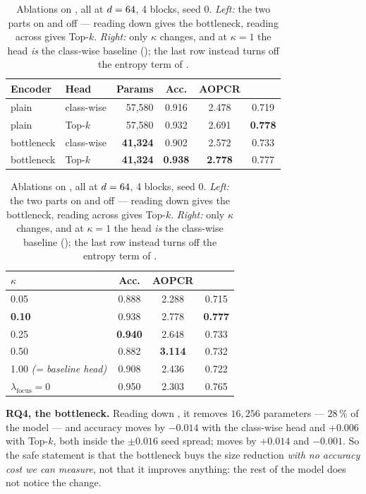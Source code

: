 \begin{table}[t]
\caption{Ablations on \webtraffic{}, all at $d = 64$, 4 blocks, seed 0. \emph{Left:} the two
parts on and off --- reading down gives the bottleneck, reading across gives \mbox{Top-$k$}.
\emph{Right:} only $\kappa$ changes, and at $\kappa = 1$ the head \emph{is} the class-wise baseline
(); the last row instead turns off the entropy term of .}
\label{tab:ablation}
\begin{center}
\begin{minipage}[t]{0.51\textwidth}
\centering
\scriptsize
\setlength{\tabcolsep}{3.5pt}
\begin{tabular}{llrccc}
\toprule
\textbf{Encoder} & \textbf{Head} & Params & Acc. & AOPCR & \ndcg{} \\
\midrule
plain      & class-wise & 57{,}580 & 0.916 & 2.478 & 0.719 \\
plain      & Top-$k$    & 57{,}580 & 0.932 & 2.691 & \textbf{0.778} \\
bottleneck & class-wise & \textbf{41{,}324} & 0.902 & 2.572 & 0.733 \\
bottleneck & Top-$k$    & \textbf{41{,}324} & \textbf{0.938} & \textbf{2.778} & 0.777 \\
\bottomrule
\end{tabular}
\end{minipage}\hfill
\begin{minipage}[t]{0.45\textwidth}
\centering
\scriptsize
\setlength{\tabcolsep}{4pt}
\begin{tabular}{lccc}
\toprule
$\kappa$ & Acc. & AOPCR & \ndcg{} \\
\midrule
0.05 & 0.888 & 2.288 & 0.715 \\
\textbf{0.10} & 0.938 & 2.778 & \textbf{0.777} \\
0.25 & \textbf{0.940} & 2.648 & 0.733 \\
0.50 & 0.882 & \textbf{3.114} & 0.732 \\
1.00 \emph{(= baseline head)} & 0.908 & 2.436 & 0.722 \\
\midrule
$\lambda_{\mathrm{focus}} = 0$ & 0.950 & 2.303 & 0.765 \\
\bottomrule
\end{tabular}
\end{minipage}
\end{center}
\end{table}

\textbf{RQ4, the bottleneck.} Reading down , it removes $16{,}256$ parameters ---
$28\,\%$ of the model --- and accuracy moves by $-0.014$ with the class-wise head and $+0.006$ with
\mbox{Top-$k$}, both inside the $\pm 0.016$ seed spread; \ndcg{} moves by $+0.014$ and $-0.001$. So
the safe statement is that the bottleneck buys the size reduction \emph{with no accuracy cost we can
measure}, not that it improves anything: the rest of the model does not notice the change.

